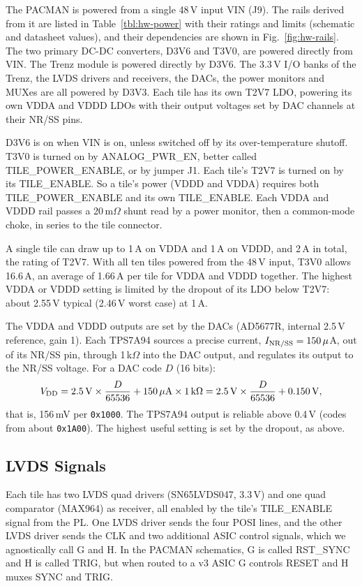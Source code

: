 \documentclass[12pt]{article}
\newcommand{\hex}[1]{\texttt{0x#1}}
\begin{document}
\noindent
The PACMAN is powered from a single 48\,V input VIN (J9).  The rails derived from it are listed in
Table~\ref{tbl:hw-power} with their ratings and limits (schematic and datasheet values), and their
dependencies are shown in Fig.~\ref{fig:hw-rails}.  The two primary DC-DC converters, D3V6 and T3V0, are
powered directly from VIN.  The Trenz module is powered directly by D3V6.  The 3.3\,V I/O banks of the
Trenz, the LVDS drivers and receivers, the DACs, the power monitors and MUXes are all powered by
D3V3.  Each tile has its own T2V7 LDO, powering its own VDDA and VDDD LDOs with their output
voltages set by DAC channels at their NR/SS pins.

D3V6 is on when VIN is on, unless switched off by its over-temperature shutoff.  T3V0 is turned on
by ANALOG\_PWR\_EN, better called TILE\_POWER\_ENABLE, or by jumper J1.  Each tile's T2V7 is turned on
by its TILE\_ENABLE.  So a tile's power (VDDD and VDDA) requires both TILE\_POWER\_ENABLE and its own
TILE\_ENABLE.  Each VDDA and VDDD rail passes a 20\,m$\Omega$ shunt read by a power monitor, then a
common-mode choke, in series to the tile connector.

A single tile can draw up to 1\,A on VDDA and 1\,A on VDDD, and 2\,A in total, the rating of T2V7.
With all ten tiles powered from the 48\,V input, T3V0 allows 16.6\,A, an average of 1.66\,A per tile
for VDDA and VDDD together.  The highest VDDA or VDDD setting is limited by the dropout of its LDO
below T2V7: about 2.55\,V typical (2.46\,V worst case) at 1\,A.

The VDDA and VDDD outputs are set by the DACs (AD5677R, internal 2.5\,V reference, gain 1).  Each TPS7A94
sources a precise current, $I_{\rm NR/SS} = 150\,\mu$A, out of its NR/SS pin, through 1\,k$\Omega$ into the
DAC output, and regulates its output to the NR/SS voltage.  For a DAC code $D$ (16 bits):
$$ V_{\rm DD} = 2.5\,{\rm V} \times \frac{D}{65536} + 150\,\mu{\rm A} \times 1\,{\rm k}\Omega
             = 2.5\,{\rm V} \times \frac{D}{65536} + 0.150\,{\rm V}, $$
             that is, 156\,mV per \hex{1000}.
The TPS7A94 output is reliable above 0.4\,V (codes from about \hex{1A00}).  The highest useful setting is set by the dropout, as above.

\subsection{LVDS Signals}

Each tile has two LVDS quad drivers (SN65LVDS047, 3.3\,V) and one quad comparator (MAX964) as
receiver, all enabled by the tile's TILE\_ENABLE signal from the PL.  One LVDS driver sends the four
POSI lines, and the other LVDS driver sends the CLK and two additional ASIC control signals, which
we agnostically call G and H.  In the PACMAN schematics, G is called RST\_SYNC and H is called
TRIG, but when routed to a v3 ASIC G controls RESET and H muxes SYNC and TRIG.
\end{document}
